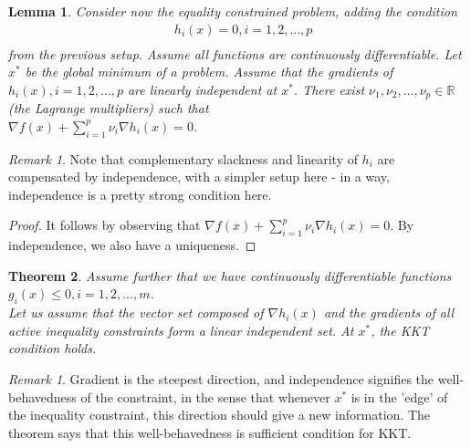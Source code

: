 \documentclass[11pt,reqno]{amsart}
\newtheorem{theorem}{Theorem}
\newtheorem{lemma}[theorem]{Lemma}
\theoremstyle{remark}
\newtheorem{remark}[example]{Remark}
\begin{document}
\begin{lemma}
Consider now the equality constrained problem, adding the condition\\
\begin{align*}
        & h_i(x)=0,i=1,2,\dots,p\\
\end{align*}
from the previous setup. Assume all functions are continuously differentiable. 
Let $x^*$ be the global minimum of a problem. Assume that
 the gradients of $h_i(x),i=1,2,\dots,p$ are linearly independent at $x^*$. There
  exist $\nu_1,\nu_2,\dots,\nu_p\in\mathbb{R}$ (the Lagrange multipliers) such that\\
  $\nabla f(x)+\sum^p_{i=1}\nu_i\nabla h_i(x)=0$.
\end{lemma}
\begin{remark}
\item Note that complementary slackness and linearity of $h_i$ are compensated by independence, with a 
simpler setup here - in a way, independence is a pretty strong condition here.
\item 
\end{remark}
\begin{proof}
It follows by observing that $\nabla f(x)+\sum_{i=1}^p\nu_i\nabla h_i(x)=0.$ By independence,
 we also have a uniqueness.
\end{proof}
\begin{theorem}
Assume further that we have continuously differentiable functions $g_i(x)\leq 0,i=1,2,\dots,m$.\\
Let us assume that the vector set composed of $\nabla h_i(x)$ and the gradients of all active inequality constraints
 form a linear independent set. At $x^*$, the KKT condition holds.
\end{theorem}
\begin{remark}
\item Gradient is the steepest direction, and independence signifies the well-behavedness of
 the constraint, in the sense that whenever $x^*$ is in the 'edge' of the inequality constraint, this direction should give a new information. The
  theorem says that this well-behavedness is sufficient condition for KKT.
\end{remark}
\end{document}
